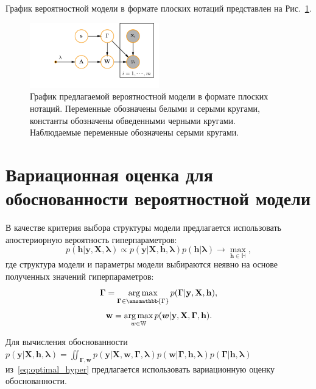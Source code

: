 График вероятностной модели в формате плоских нотаций представлен на Рис.~\ref{fig:plate_prob}.
\begin{figure}
\centering
   \includegraphics[width=0.5\textwidth]{plots/notebooks/simple_plate.pdf}
\caption{График предлагаемой вероятностной модели в формате плоских нотаций. Переменные обозначены белыми и серыми кругами, константы обозначены обведенными черными кругами. Наблюдаемые переменные обозначены серыми кругами.}
\label{fig:plate_prob}
\end{figure}

\section{Вариационная оценка для обоснованности вероятностной модели}
В качестве критерия выбора структуры модели предлагается использовать апостериорную вероятность гиперпараметров:
\begin{equation}
\label{eq:optimal_hyper}
    p(\mathbf{h}|\mathbf{y}, \mathbf{X}, \boldsymbol{\lambda}) \propto p(\mathbf{y}|\mathbf{X}, \mathbf{h}, \boldsymbol{\lambda}) p(\mathbf{h}|\boldsymbol{\lambda}) \to \max_{\mathbf{h} \in \mathbb{H}},
\end{equation}
где структура модели и параметры модели выбираются неявно на основе полученных значений гиперпараметров:
\[
    \boldsymbol{\Gamma} = \argmax_{\boldsymbol{\Gamma} \in \amsmathbb{\Gamma}} p(\boldsymbol{\Gamma}|\mathbf{y}, \mathbf{X}, \mathbf{h}),
\]
\[
    \mathbf{w} = \operatorname*{arg\,max}_{w \in \mathbb{W}} p(\boldsymbol{w}|\mathbf{y}, \mathbf{X}, \boldsymbol{\Gamma}, \mathbf{h}).
\]

Для вычисления обоснованности $p(\mathbf{y}|\mathbf{X}, \mathbf{h}, \boldsymbol{\lambda}) = \iint_{\boldsymbol{\Gamma},\mathbf{w}}p(\mathbf{y}|\mathbf{X}, \mathbf{w}, \boldsymbol{\Gamma},\boldsymbol{\lambda})p(\mathbf{w}|\boldsymbol{\Gamma},\mathbf{h}, \boldsymbol{\lambda})p(\boldsymbol{\Gamma}|\mathbf{h}, \boldsymbol{\lambda})$ из~\eqref{eq:optimal_hyper} предлагается использовать вариационную оценку обоснованности.

